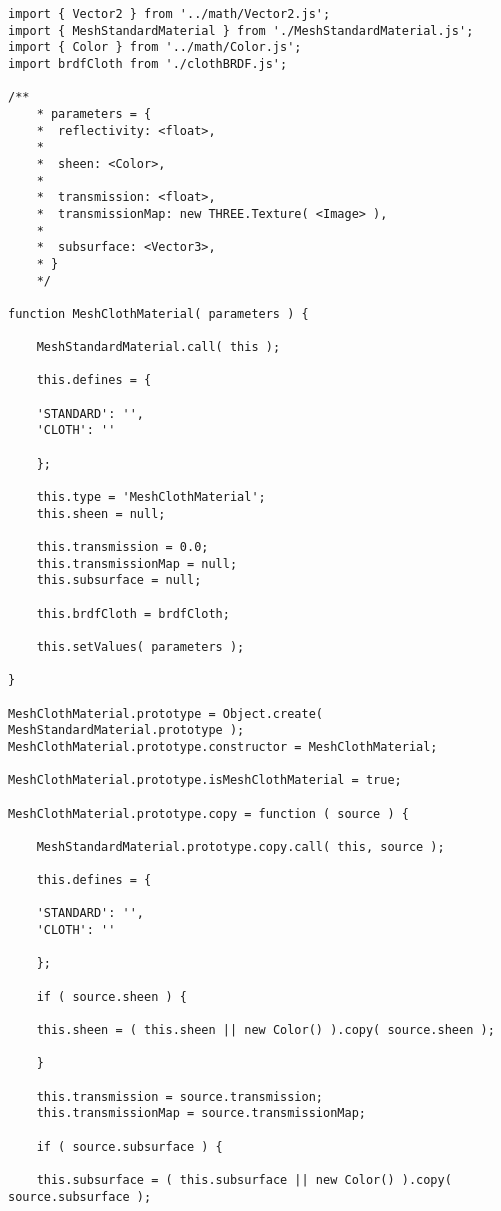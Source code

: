     \bgroup

    \begin{lstlisting}[caption=Clase MeshClothMaterial]
import { Vector2 } from '../math/Vector2.js';
import { MeshStandardMaterial } from './MeshStandardMaterial.js';
import { Color } from '../math/Color.js';
import brdfCloth from './clothBRDF.js';

/**
    * parameters = {
    *  reflectivity: <float>,
    *
    *  sheen: <Color>,
    *
    *  transmission: <float>,
    *  transmissionMap: new THREE.Texture( <Image> ),
    *
    *  subsurface: <Vector3>,
    * }
    */

function MeshClothMaterial( parameters ) {

    MeshStandardMaterial.call( this );

    this.defines = {

    'STANDARD': '',
    'CLOTH': ''

    };

    this.type = 'MeshClothMaterial';
    this.sheen = null;

    this.transmission = 0.0;
    this.transmissionMap = null;
    this.subsurface = null;

    this.brdfCloth = brdfCloth;

    this.setValues( parameters );

}

MeshClothMaterial.prototype = Object.create( MeshStandardMaterial.prototype );
MeshClothMaterial.prototype.constructor = MeshClothMaterial;

MeshClothMaterial.prototype.isMeshClothMaterial = true;

MeshClothMaterial.prototype.copy = function ( source ) {

    MeshStandardMaterial.prototype.copy.call( this, source );

    this.defines = {

    'STANDARD': '',
    'CLOTH': ''

    };

    if ( source.sheen ) {

    this.sheen = ( this.sheen || new Color() ).copy( source.sheen );

    }

    this.transmission = source.transmission;
    this.transmissionMap = source.transmissionMap;

    if ( source.subsurface ) {

    this.subsurface = ( this.subsurface || new Color() ).copy( source.subsurface );


\end{lstlisting}
